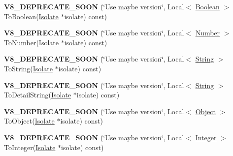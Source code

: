 \begin{DoxyCompactItemize}
\item 
\hypertarget{classv8_1_1Value_ad3b9978f3fedccb48817ce87c5a454ed}{}{\bfseries V8\+\_\+\+D\+E\+P\+R\+E\+C\+A\+T\+E\+\_\+\+S\+O\+O\+N} (\char`\"{}Use maybe version\char`\"{}, Local$<$ \hyperlink{classv8_1_1Boolean}{Boolean} $>$ To\+Boolean(\hyperlink{classv8_1_1Isolate}{Isolate} $\ast$isolate) const)\label{classv8_1_1Value_ad3b9978f3fedccb48817ce87c5a454ed}

\item 
\hypertarget{classv8_1_1Value_a855a0b74584b9c322c04891783f37e9c}{}{\bfseries V8\+\_\+\+D\+E\+P\+R\+E\+C\+A\+T\+E\+\_\+\+S\+O\+O\+N} (\char`\"{}Use maybe version\char`\"{}, Local$<$ \hyperlink{classv8_1_1Number}{Number} $>$ To\+Number(\hyperlink{classv8_1_1Isolate}{Isolate} $\ast$isolate) const)\label{classv8_1_1Value_a855a0b74584b9c322c04891783f37e9c}

\item 
\hypertarget{classv8_1_1Value_a898f773c591e760fcb98e99cccff3e5c}{}{\bfseries V8\+\_\+\+D\+E\+P\+R\+E\+C\+A\+T\+E\+\_\+\+S\+O\+O\+N} (\char`\"{}Use maybe version\char`\"{}, Local$<$ \hyperlink{classv8_1_1String}{String} $>$ To\+String(\hyperlink{classv8_1_1Isolate}{Isolate} $\ast$isolate) const)\label{classv8_1_1Value_a898f773c591e760fcb98e99cccff3e5c}

\item 
\hypertarget{classv8_1_1Value_a7966967b1b55bf39487b4485aa821fb2}{}{\bfseries V8\+\_\+\+D\+E\+P\+R\+E\+C\+A\+T\+E\+\_\+\+S\+O\+O\+N} (\char`\"{}Use maybe version\char`\"{}, Local$<$ \hyperlink{classv8_1_1String}{String} $>$ To\+Detail\+String(\hyperlink{classv8_1_1Isolate}{Isolate} $\ast$isolate) const)\label{classv8_1_1Value_a7966967b1b55bf39487b4485aa821fb2}

\item 
\hypertarget{classv8_1_1Value_a4c98939a72d6c48b01c8279cfe218d34}{}{\bfseries V8\+\_\+\+D\+E\+P\+R\+E\+C\+A\+T\+E\+\_\+\+S\+O\+O\+N} (\char`\"{}Use maybe version\char`\"{}, Local$<$ \hyperlink{classv8_1_1Object}{Object} $>$ To\+Object(\hyperlink{classv8_1_1Isolate}{Isolate} $\ast$isolate) const)\label{classv8_1_1Value_a4c98939a72d6c48b01c8279cfe218d34}

\item 
\hypertarget{classv8_1_1Value_aae926c4392edf0ad4a5383ab0d8af4b1}{}{\bfseries V8\+\_\+\+D\+E\+P\+R\+E\+C\+A\+T\+E\+\_\+\+S\+O\+O\+N} (\char`\"{}Use maybe version\char`\"{}, Local$<$ \hyperlink{classv8_1_1Integer}{Integer} $>$ To\+Integer(\hyperlink{classv8_1_1Isolate}{Isolate} $\ast$isolate) const)\label{classv8_1_1Value_aae926c4392edf0ad4a5383ab0d8af4b1}


\end{DoxyCompactItemize}
